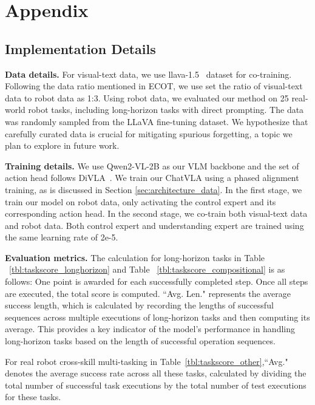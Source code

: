 \clearpage
\setcounter{page}{1}
\maketitlesupplementary


\section{Appendix}
\label{sec:appendix}


\subsection{Implementation Details}

\textbf{Data details.}
For visual-text data, we use llava-1.5~\cite{llava1.5} dataset for co-training. Following the data ratio mentioned in ECOT, we use set the ratio of visual-text data to robot data as 1:3. Using robot data, we evaluated our method on 25 real-world robot tasks, including long-horizon tasks with direct prompting. The data was randomly sampled from the LLaVA fine-tuning dataset.  We hypothesize that carefully curated data is crucial for mitigating spurious forgetting, a topic we plan to explore in future work.


\textbf{Training details.} We use Qwen2-VL-2B as our VLM backbone and the set of action head follows DiVLA~\cite{wen2024diffusionvla}.
We train our ChatVLA using a phased alignment training, as is discussed in Section \ref{sec:architecture_data}. In the first stage, we train our model on robot data, only activating the control expert and its corresponding action head. In the second stage, we co-train both visual-text data and robot data. Both control expert and understanding expert are trained using the same learning rate of 2e-5. 


\textbf{Evaluation metrics.}
The calculation for long-horizon tasks in Table ~\ref{tbl:taskscore_longhorizon} and Table ~\ref{tbl:taskscore_compositional} is as follows: One point is awarded for each successfully completed step. Once all steps are executed, the total score is computed. ``Avg. Len." represents the average success length, which is calculated by recording the lengths of successful sequences across multiple executions of long-horizon tasks and then computing its average. This provides a key indicator of the model's performance in handling long-horizon tasks based on the length of successful operation sequences.

For real robot cross-skill multi-tasking in Table~\ref{tbl:taskscore_other},``Avg." denotes the average success rate across all these tasks, calculated by dividing the total number of successful task executions by the total number of test executions for these tasks.


